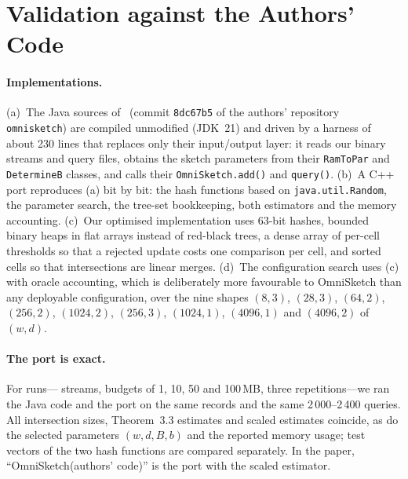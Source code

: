 \documentclass[sigconf,review,anonymous]{acmart}
\newcommand{\omni}{OmniSketch\xspace}
\begin{document}
\section{Validation against the Authors' Code}\label{app:validation}

\begin{table}[t]
\centering\footnotesize\setlength{\tabcolsep}{3pt}
\caption{Normalized absolute error of \omni implementations on record-sampled queries with $k\ge2$
predicates (mean of 3 repetitions). ``Thm.~3.3'' is the value returned by the authors' code,
``scaled'' the estimate it logs and that the published plots use; the C++ port reproduces both columns
exactly. Zipf$^\dagger$: streams from the authors' generator. RS: row reservoir at the same budget.}
\label{tab:validation}

\end{table}

\paragraph{Implementations.} (a)~The Java sources of~\cite{omni} (commit \texttt{8dc67b5} of the
authors' repository \texttt{omnisketch}) are compiled unmodified (JDK~21) and driven by a harness of about 230 lines that
replaces only their input/output layer: it reads our binary streams and query files, obtains the sketch
parameters from their \texttt{RamToPar} and \texttt{DetermineB} classes, and calls their
\texttt{OmniSketch.add()} and \texttt{query()}. (b)~A C++ port reproduces (a) bit by bit: the
hash functions based on \texttt{java.util.Random}, the parameter search, the tree-set bookkeeping, both
estimators and the memory accounting. (c)~Our optimised implementation uses 63-bit hashes, bounded binary
heaps in flat arrays instead of red-black trees, a dense array of per-cell thresholds so that a rejected
update costs one comparison per cell, and sorted cells so that intersections are linear merges. (d)~The
configuration search uses (c) with oracle accounting, which is deliberately more favourable to \omni than
any deployable configuration, over the nine shapes $(8,3)$, $(28,3)$, $(64,2)$, $(256,2)$, $(1024,2)$,
$(256,3)$, $(1024,1)$, $(4096,1)$ and $(4096,2)$ of $(w,d)$.

\paragraph{The port is exact.} For \NumValRuns{} runs---\NumValStreams{} streams, budgets of 1, 10, 50 and
100\,MB, three repetitions---we ran the Java code and the port on the same records and the same
2\,000--2\,400 queries. All \NumValQueries{} intersection sizes, Theorem~3.3 estimates and scaled
estimates coincide, as do the selected parameters $(w,d,B,b)$ and the reported memory usage; test vectors
of the two hash functions are compared separately. In the paper, ``\omni (authors' code)'' is the port
with the scaled estimator.
\end{document}
